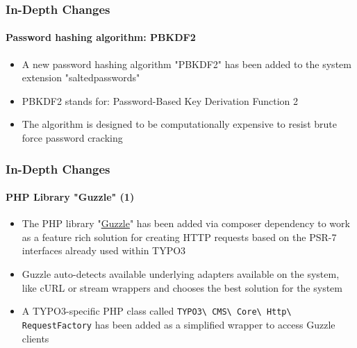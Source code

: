 \begin{frame}[fragile]
	\frametitle{In-Depth Changes}
	\framesubtitle{Password hashing algorithm: PBKDF2}

	\begin{itemize}

		\item A new password hashing algorithm "PBKDF2" has been added to the system extension "saltedpasswords"

		\item PBKDF2 stands for: Password-Based Key Derivation Function 2

		\item The algorithm is designed to be computationally expensive to resist brute force password cracking

	\end{itemize}

\end{frame}

\begin{frame}[fragile]
	\frametitle{In-Depth Changes}
	\framesubtitle{PHP Library "Guzzle" (1)}

	\begin{itemize}

		\item The PHP library
			"\href{http://docs.guzzlephp.org}{Guzzle}"
			has been added via composer dependency to work as a feature rich
			solution for creating HTTP requests based on the PSR-7 interfaces
			already used within TYPO3

		\item Guzzle auto-detects available underlying adapters available on
			the system, like cURL or stream wrappers and chooses the best
			solution for the system

		\item A TYPO3-specific PHP class called
			\texttt{TYPO3\textbackslash
				CMS\textbackslash
				Core\textbackslash
				Http\textbackslash
				RequestFactory}\newline
			has been added as a simplified wrapper to access Guzzle clients

	\end{itemize}

\end{frame}


